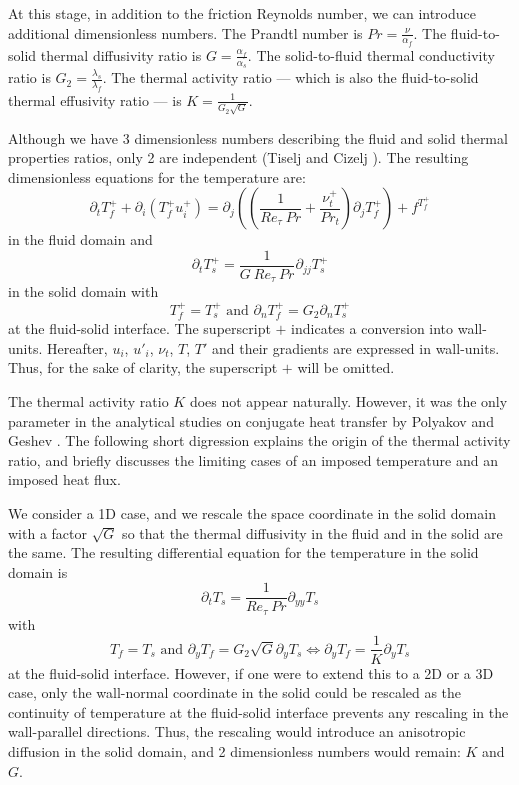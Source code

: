 \documentclass{svjour3}                     %
\begin{document}
At this stage, in addition to the friction Reynolds number, we can introduce additional dimensionless numbers.
The Prandtl number is ${Pr = \frac{\nu}{\alpha_f}}$.
The fluid-to-solid thermal diffusivity ratio is ${G = \frac{\alpha_f}{\alpha_s}}$.
The solid-to-fluid thermal conductivity ratio is ${G_2 = \frac{\lambda_s}{\lambda_f}}$.
The thermal activity ratio --- which is also the fluid-to-solid thermal effusivity ratio --- is ${K = \frac{1}{G_2\sqrt{G}}}$.

Although we have 3 dimensionless numbers describing the fluid and solid thermal properties ratios, only 2 are independent (Tiselj and Cizelj \cite{tiselj2012dns}).
The resulting dimensionless equations for the temperature are:
\begin{equation}
\partial_t T_f^+ + \partial_i \left( T_f^+ u_i^+ \right) = \partial_j \left( \left( \frac{1}{Re_\tau~Pr} + \frac{\nu_t^+}{{Pr}_t} \right) \partial_j T_f^+ \right) + f^{T_f^+}
\end{equation}
in the fluid domain and
\begin{equation}
\partial_t T_s^+ = \frac{1}{G~Re_\tau~Pr} \partial_{jj} T_s^+
\label{eq-evolution_t_sol}
\end{equation}
in the solid domain with
\begin{equation}
T_f^+ = T_s^+ \mbox{ and } \partial_n T_f^+ = G_2 \partial_n T_s^+
\end{equation}
at the fluid-solid interface.
The superscript $+$ indicates a conversion into wall-units.
Hereafter, $u_i$, $u'_i$, $\nu_t$, $T$, $T'$ and their gradients are expressed in wall-units.
Thus, for the sake of clarity, the superscript $+$ will be omitted.

The thermal activity ratio $K$ does not appear naturally.
However, it was the only parameter in the analytical studies on conjugate heat transfer by Polyakov \cite{poliakov1974wall} and Geshev \cite{geshev1978influence}.
The following short digression explains the origin of the thermal activity ratio, and briefly discusses the limiting cases of an imposed temperature and an imposed heat flux.

We consider a 1D case, and we rescale the space coordinate in the solid domain with a factor $\sqrt{G}$ so that the thermal diffusivity in the fluid and in the solid are the same.
The resulting differential equation for the temperature in the solid domain is
\begin{equation}
\partial_t T_s = \frac{1}{Re_\tau~Pr} \partial_{yy} T_s
\end{equation}
with
\begin{equation}
T_f = T_s \mbox{ and } \partial_y T_f = G_2 \sqrt{G} \partial_y T_s \Longleftrightarrow \partial_y T_f = \frac{1}{K} \partial_y T_s
\end{equation}
at the fluid-solid interface.
However, if one were to extend this to a 2D or a 3D case, only the wall-normal coordinate in the solid could be rescaled as the continuity of temperature at the fluid-solid interface prevents any rescaling in the wall-parallel directions.
Thus, the rescaling would introduce an anisotropic diffusion in the solid domain, and 2 dimensionless numbers would remain: $K$ and $G$.
\end{document}
